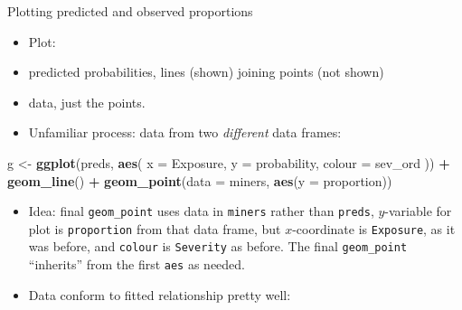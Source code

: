 \documentclass[ignorenonframetext,]{beamer}
\newenvironment{Shaded}{\begin{snugshade}}{\end{snugshade}}
\newcommand{\DataTypeTok}[1]{\textcolor[rgb]{0.13,0.29,0.53}{#1}}
\newcommand{\KeywordTok}[1]{\textcolor[rgb]{0.13,0.29,0.53}{\textbf{#1}}}
\newcommand{\NormalTok}[1]{#1}
\newcommand{\OperatorTok}[1]{\textcolor[rgb]{0.81,0.36,0.00}{\textbf{#1}}}
\newcommand{\StringTok}[1]{\textcolor[rgb]{0.31,0.60,0.02}{#1}}
\begin{document}
\begin{frame}[fragile]{Plotting predicted and observed proportions}
\protect\hypertarget{plotting-predicted-and-observed-proportions}{}

\begin{itemize}
\item
  Plot:
\item
  predicted probabilities, lines (shown) joining points (not shown)
\item
  data, just the points.
\item
  Unfamiliar process: data from two \emph{different} data frames:
\end{itemize}

\begin{Shaded}
\begin{Highlighting}[]
\NormalTok{g <-}\StringTok{ }\KeywordTok{ggplot}\NormalTok{(preds, }\KeywordTok{aes}\NormalTok{(}
  \DataTypeTok{x =}\NormalTok{ Exposure, }\DataTypeTok{y =}\NormalTok{ probability,}
  \DataTypeTok{colour =}\NormalTok{ sev_ord}
\NormalTok{)) }\OperatorTok{+}\StringTok{ }\KeywordTok{geom_line}\NormalTok{() }\OperatorTok{+}
\StringTok{  }\KeywordTok{geom_point}\NormalTok{(}\DataTypeTok{data =}\NormalTok{ miners, }\KeywordTok{aes}\NormalTok{(}\DataTypeTok{y =}\NormalTok{ proportion))}
\end{Highlighting}
\end{Shaded}

\begin{itemize}
\item
  Idea: final \texttt{geom\_point} uses data in \texttt{miners} rather
  than \texttt{preds}, \(y\)-variable for plot is \texttt{proportion}
  from that data frame, but \(x\)-coordinate is \texttt{Exposure}, as it
  was before, and \texttt{colour} is \texttt{Severity} as before. The
  final \texttt{geom\_point} ``inherits'' from the first \texttt{aes} as
  needed.
\item
  Data conform to fitted relationship pretty well:
\end{itemize}

\end{frame}
\end{document}

